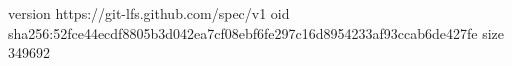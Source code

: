 version https://git-lfs.github.com/spec/v1
oid sha256:52fce44ecdf8805b3d042ea7cf08ebf6fe297c16d8954233af93ccab6de427fe
size 349692
